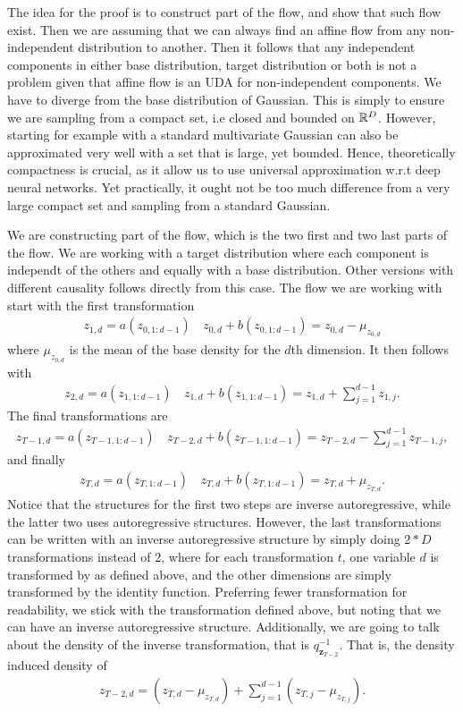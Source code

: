 The idea for the proof is to construct part of the flow, and show that such flow exist. Then we are assuming that we can 
always find an affine flow from any non-independent distribution to another. Then it follows that any independent components 
in either base distribution, target distribution or both is not a problem given that affine flow is an UDA for non-independent
components. We have to diverge from the base distribution of Gaussian. This is simply to ensure we are sampling from a 
compact set, i.e closed and bounded on \(\mathbb{R}^D\). However, starting for example with a standard multivariate Gaussian
can also be approximated very well with a set that is large, yet bounded. Hence, theoretically
compactness is crucial, as it allow us to use universal approximation w.r.t deep neural networks. Yet practically, it 
ought not be too much difference from a very large compact set and sampling from a standard Gaussian. 

We are constructing part of the flow, which is the two first and two last parts of the flow. 
We are working with a target distribution
where each component is independt of the others and equally with a base distribution. Other versions with different causality
follows directly from this case. The flow we are working with start with the first transformation
\begin{align*}
    z_{1,d} = a(z_{0,1:d-1})&\,z_{0,d} + b(z_{0,1:d-1}) = z_{0,d} - \mu_{z_{0,d}}
\end{align*}
where \(\mu_{z_{0,d}}\) is the mean of the base density for the \(d\)th dimension. It then follows with 
\begin{align*}
    z_{2,d} = a(z_{1,1:d-1})&\,z_{1,d} + b(z_{1,1:d-1}) = z_{1,d} + \sum_{j=1}^{d-1} z_{1,j}.
\end{align*}
The final transformations are
\begin{align*}
    z_{T-1,d} = a(z_{T-1,1:d-1})&\,z_{T-2,d} + b(z_{T-1,1:d-1}) = z_{T-2,d} - \sum_{j=1}^{d-1} z_{T-1,j},
\end{align*} 
and finally
\begin{align*}
    z_{T,d} = a(z_{T,1:d-1})&\,z_{T,d} + b(z_{T,1:d-1}) = z_{T,d} + \mu_{z_{T,d}}.
\end{align*}
Notice that the structures for the first two steps are inverse autoregressive, while the latter two uses 
autoregressive structures. However, the last transformations can be written with an inverse autoregressive structure
by simply doing \(2*D\) transformations instead of 2, where for each transformation \(t\), one variable \(d\) is transformed by
as defined above, and the other dimensions are simply transformed by the identity function. Preferring fewer transformation
for readability, we stick with the transformation defined above, but noting that we can have an inverse autoregressive
structure. Additionally, we are going to talk about the density of the inverse transformation, that is \(q_{\bm z_{T-2}}^{-1}\). That is,
the density induced density of
\begin{align*}
    z_{T-2,d} =  (z_{T,d}-\mu_{z_{T,d}}) + \sum_{j=1}^{d-1} (z_{T,j}-\mu_{z_{T,j}}).
\end{align*}

